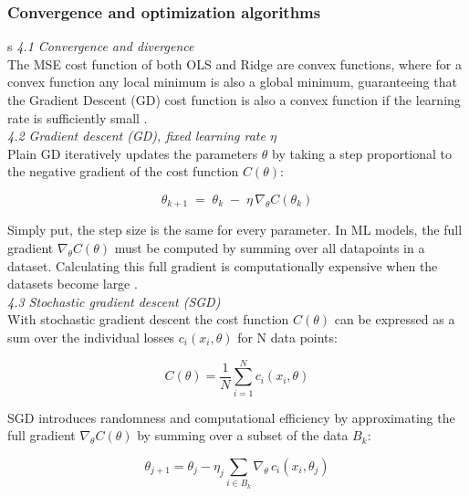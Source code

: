 \documentclass[amssymb,twocolumn,aps,floatfix]{revtex4-2}
\begin{document}
\subsubsection{Convergence and optimization algorithms}
\label{subsubsec:opt_theory}
s
\textit{4.1 Convergence and divergence} \\

The MSE cost function of both OLS and Ridge are convex functions, where for a convex function any local minimum is also a global minimum, guaranteeing that the Gradient Descent (GD) cost function is also a convex function if the learning rate is sufficiently small \cite{hj_week36}. \\

\textit{4.2 Gradient descent (GD), fixed learning rate $\eta$} \\

Plain GD iteratively updates the parameters $\theta$ by taking a step proportional to the negative gradient of the cost function $C(\theta)$: 

\begin{equation}
\theta_{k+1} \;=\; \theta_k \;-\; \eta \,\nabla_{\theta} C(\theta_k)
\end{equation}

Simply put, the step size is the same for every parameter. In ML models, the full gradient $\nabla_{\theta} C(\theta)$ must be computed by summing over all datapoints in a dataset. Calculating this full gradient is computationally expensive when the datasets become large \cite{hj_week37}. \\ 

\textit{4.3 Stochastic gradient descent (SGD)} \\

With stochastic gradient descent the cost function $C(\theta)$ can be expressed as a sum over the individual losses $c_i(x_i,\theta)$ for N data points:

\begin{equation}
    C(\theta) = \frac{1}{N}\sum_{i=1}^{N} c_i(x_i,\theta)
\end{equation}

SGD introduces randomness and computational efficiency by approximating the full gradient $\nabla_{\theta} C(\theta)$ by summing over a subset of the data $B_k$: 

\begin{equation}
    \theta_{j+1}
= \theta_j - \eta_j \sum_{i \in B_k} \nabla_{\theta}\, c_i(x_i,\theta_j)
\end{equation}
\end{document}
